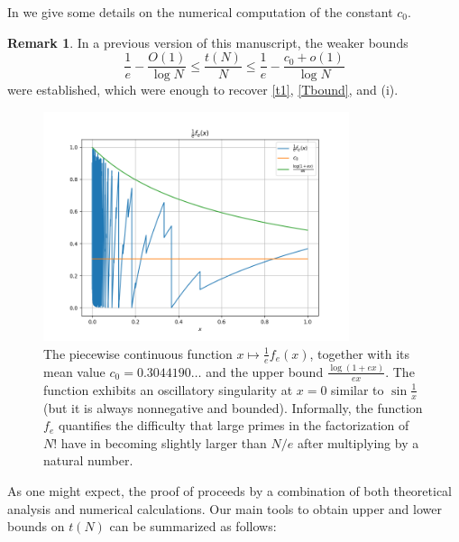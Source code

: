 \documentclass[12pt,a4paper,reqno]{amsart}
\numberwithin{equation}{section}
\theoremstyle{plain}
\theoremstyle{definition}
\newtheorem{remark}[theorem]{Remark}
\begin{document}
In  we give some details on the numerical computation of the constant $c_0$.

\begin{remark}\label{old} In a previous version \cite{tao} of this manuscript, the weaker bounds
  $$ \frac{1}{e} - \frac{O(1)}{\log N} \leq \frac{t(N)}{N} \leq \frac{1}{e} - \frac{c_0+o(1)}{\log N}$$
were established, which were enough to recover \eqref{t1}, \eqref{Tbound}, and (i). 
\end{remark}  

\begin{figure}
  \centering
  \includegraphics[width=0.8\textwidth]{integ.png}
  \caption{The piecewise continuous function $x\mapsto \frac{1}{e} f_e(x)$, together with its mean value $c_0 = 0.3044190\dots$ and the upper bound $\frac{\log(1+ex)}{ex}$.  The function exhibits an oscillatory singularity at $x=0$ similar to $\sin \frac{1}{x}$ (but it is always nonnegative and bounded). Informally, the function $f_e$ quantifies the difficulty that large primes in the factorization of $N!$ have in becoming slightly larger than $N/e$ after multiplying by a natural number.}\label{fig-mean}
\end{figure}

As one might expect, the proof of  proceeds by a combination of both theoretical analysis and numerical calculations.  Our main tools to obtain upper and lower bounds on $t(N)$ can be summarized as follows:
\end{document}
